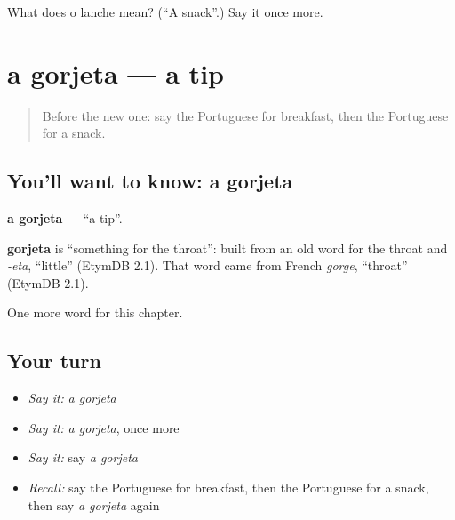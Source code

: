 \begin{tcolorbox}[breakable,colback=teal!4,colframe=teal!35!black,title={Before you move on}]
What does o lanche mean? (\textquotedblleft{}A snack\textquotedblright{}.) Say it once more.
\end{tcolorbox}
\section[a gorjeta]{a gorjeta — a tip}

\label{lesson:PT-C218-gorjeta}



\begin{quote}
Before the new one: say the Portuguese for breakfast, then the Portuguese for a snack.
\end{quote}

\subsection*{You'll want to know: a gorjeta}
\textbf{a gorjeta} — \textquotedblleft{}a tip\textquotedblright{}.

\begin{cousinweb}
\textbf{gorjeta} is \textquotedblleft{}something for the throat\textquotedblright{}: built from an old word for the throat and \emph{-eta}, \textquotedblleft{}little\textquotedblright{} (EtymDB 2.1). That word came from French \emph{gorge}, \textquotedblleft{}throat\textquotedblright{} (EtymDB 2.1).
\end{cousinweb}

\begin{grammarlens}[title={What you've built}]
One more word for this chapter.
\end{grammarlens}

\subsection*{Your turn}
\begin{itemize}
\raggedright
  \item \emph{Say it:} \emph{a gorjeta}
  \item \emph{Say it:} \emph{a gorjeta}, once more
  \item \emph{Say it:} say \emph{a gorjeta}
  \item \emph{Recall:} say the Portuguese for breakfast, then the Portuguese for a snack, then say \emph{a gorjeta} again
\end{itemize}

